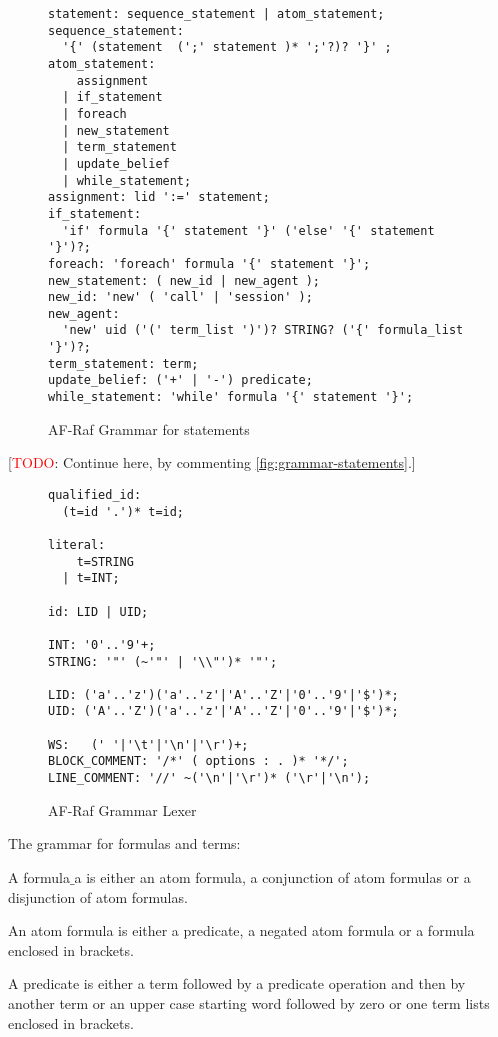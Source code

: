 \documentclass[a4paper,12pt,oneside,fleqn]{book} %
\newcommand{\todo}[1]{[\textcolor{red}{TODO}: #1]}
\begin{document}
\begin{figure}\footnotesize %
\begin{verbatim}
statement: sequence_statement | atom_statement;
sequence_statement:
  '{' (statement  (';' statement )* ';'?)? '}' ;
atom_statement:
    assignment
  | if_statement
  | foreach
  | new_statement
  | term_statement
  | update_belief
  | while_statement;
assignment: lid ':=' statement;
if_statement:
  'if' formula '{' statement '}' ('else' '{' statement '}')?;
foreach: 'foreach' formula '{' statement '}';
new_statement: ( new_id | new_agent );
new_id: 'new' ( 'call' | 'session' );
new_agent:
  'new' uid ('(' term_list ')')? STRING? ('{' formula_list '}')?;
term_statement: term;
update_belief: ('+' | '-') predicate;
while_statement: 'while' formula '{' statement '}';
\end{verbatim}
\caption{AF-Raf Grammar for statements}
\label{fig:grammar-statements}
\end{figure} %

\todo{Continue here, by commenting \autoref{fig:grammar-statements}.}


\begin{figure}\footnotesize %
\begin{verbatim}
qualified_id:
  (t=id '.')* t=id;

literal:
    t=STRING
  | t=INT;

id: LID | UID;

INT: '0'..'9'+;
STRING: '"' (~'"' | '\\"')* '"';

LID: ('a'..'z')('a'..'z'|'A'..'Z'|'0'..'9'|'$')*;
UID: ('A'..'Z')('a'..'z'|'A'..'Z'|'0'..'9'|'$')*;

WS:   (' '|'\t'|'\n'|'\r')+;
BLOCK_COMMENT: '/*' ( options : . )* '*/';
LINE_COMMENT: '//' ~('\n'|'\r')* ('\r'|'\n');

\end{verbatim}
\caption{AF-Raf Grammar Lexer}
\label{fig:Grammar-lexer}
\end{figure} %


The grammar for formulas and terms:


A formula$\_$a is either an atom formula, a conjunction of atom formulas or a
disjunction of atom formulas.

An atom formula is either a predicate, a negated atom formula or a formula
enclosed in brackets.

A predicate is either a term followed by a predicate operation and then by
another term or an upper case starting word followed by zero or one term
lists enclosed in brackets.
\end{document}
